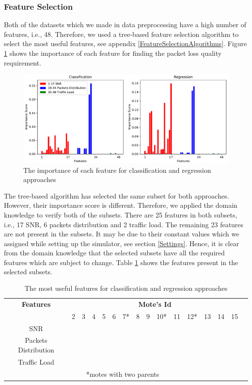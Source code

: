 \documentclass[a4paper,12pt]{article}
\begin{document}
\subsubsection{Feature Selection} \label{FeatureSelectionSection}
Both of the datasets which we made in data preprocessing have a high number of features, i.e., 48. Therefore, we used a tree-based feature selection algorithm to select the most useful features, see appendix \ref{FeatureSelectionAlgorithms}. Figure \ref{FeatureSelection} shows the importance of each feature for finding the packet loss quality requirement.
\begin{figure}[H]
	\centering
	\includegraphics[keepaspectratio, width=\linewidth]{graphs/FeatureSelection.pdf}
	\caption{The importance of each feature for classification and regression approaches}
	\label{FeatureSelection}
\end{figure}
The tree-based algorithm has selected the same subset for both approaches. However, their importance score is different. Therefore, we applied the domain knowledge to verify both of the subsets. There are 25 features in both subsets, i.e., 17 SNR, 6 packets distribution and 2 traffic load. The remaining 23 features are not present in the subsets. It may be due to their constant values which we assigned while setting up the simulator, see section \ref{Settings}. Hence, it is clear from the domain knowledge that the selected subsets have all the required features which are subject to change. Table \ref{SelectedFeatures} shows the features present in the selected subsets.
\begin{table}[H]
	\centering
	\begin{tabular}{c|ccccccccccccccc}
		\hline
		\multicolumn{1}{c}{\textbf{Features}} & \multicolumn{14}{|c}{\textbf{Mote's Id}} \\
		\cline{1-2} \cline{3-15}
		& 2 & 3 & 4 & 5 & 6 & 7* & 8 & 9 & 10* & 11 & 12* & 13 & 14 & 15 \\
		\hline
		SNR & \checkmark & \checkmark & \checkmark & \checkmark & \checkmark & \checkmark & \checkmark & 
		\checkmark & \checkmark & \checkmark & \checkmark & \checkmark & \checkmark & \checkmark \\
		\hline
		Packets Distribution & & & & & & \checkmark & & & \checkmark & & \checkmark & & & \\
		\hline
		Traffic Load & & & & & & & & & \checkmark & & \checkmark & & & \\
		\cline{1-15}
		\multicolumn{15}{c}{*motes with two parents}
	\end{tabular}
	\caption{The most useful features for classification and regression approaches}
	\label{SelectedFeatures}
\end{table}
\end{document}

